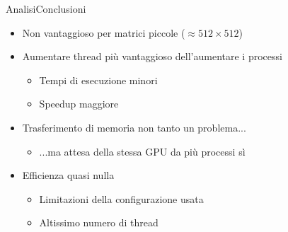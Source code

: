 \begin{frame}{Analisi}{Conclusioni}
    \begin{itemize}
        \item Non vantaggioso per matrici piccole ($\approx 512 \times 512$)
        \item Aumentare thread più vantaggioso dell'aumentare i processi
              \begin{itemize}
                  \item Tempi di esecuzione minori
                  \item Speedup maggiore
              \end{itemize}
        \item Trasferimento di memoria non tanto un problema...
              \begin{itemize}
                  \item ...ma attesa della stessa GPU da più processi sì
              \end{itemize}
        \item Efficienza quasi nulla
              \begin{itemize}
                  \item Limitazioni della configurazione usata
                  \item Altissimo numero di thread
              \end{itemize}
    \end{itemize}
\end{frame}